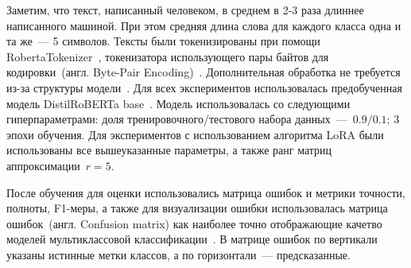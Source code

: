 Заметим, что текст, написанный человеком, в среднем в 2-3 раза длиннее написанного машиной. При этом средняя длина слова для каждого класса одна и та же~--- 5 символов. Тексты были токенизированы при помощи RobertaTokenizer~\cite{wolf2019huggingface}, токенизатора использующего пары байтов для кодировки~(англ. Byte-Pair Encoding)~\cite{wang2020neural}. Дополнительная обработка не требуется из-за структуры модели~\cite{vaswani2017attention}. Для всех экспериментов использовалась предобученная модель DistilRoBERTa base~\cite{liu2019roberta}. Модель использовалась со следующими гиперпараметрами: доля тренировочного/тестового набора данных~---~$0.9/0.1$; 3 эпохи обучения. Для экспериментов с использованием алгоритма LoRA были использованы все вышеуказанные параметры, а также ранг матриц аппроксимации~$r = 5$.

После обучения для оценки использовались матрица ошибок и метрики точности, полноты, F1-меры, а также для визуализации ошибки использовалась матрица ошибок~(англ. Confusion matrix) как наиболее точно отображающие качетво моделей мультиклассовой классификации~\cite{grandini2020metrics}. В матрице ошибок по вертикали указаны истинные метки классов, а по горизонтали~--- предсказанные.

